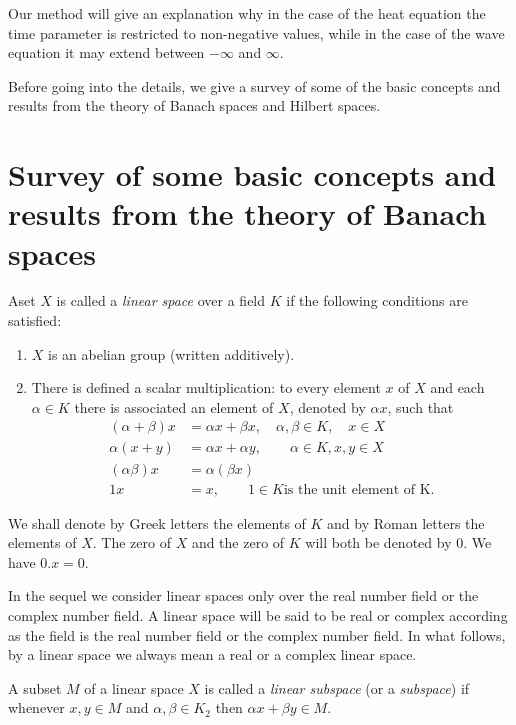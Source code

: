 Our method will give an explanation why in the case of the heat
equation the time parameter is restricted to non-negative values,
while in the case of the wave equation it may extend between $-
\infty$ and $\infty$. 

Before going into the details, we give a survey of some of the basic
concepts and results from the theory of Banach spaces and Hilbert
spaces. 

\part[Survey of some basic concepts and ...]{Survey of some basic concepts and results from the
 theory of Banach spaces}\label{chap1:p1} 

\begin{defi*}%
 A\pageoriginale set $X$ is called a {\em linear space} over a field $K$ if the
 following conditions are satisfied: 
 \begin{enumerate}[1)]
 \item $X$ is an abelian group (written additively).
 \item There is defined a scalar multiplication: to every element $x$
  of $X$ and each $\alpha \in K$ there is associated an element of
  $X$, denoted by $\alpha x$, such that 
 \begin{align*}
  (\alpha + \beta)x & = \alpha x + \beta x, \quad \alpha, \beta \in
  K, \quad x \in X\\ 
  \alpha (x + y) & = \alpha x + \alpha y, \qquad \alpha \in K, x, y
  \in X\\ 
  (\alpha \beta)x & = \alpha (\beta x)\\
  1x & = x, \qquad 1 \in K \text{is the unit element of K.}
 \end{align*}
 \end{enumerate}
\end{defi*}

We shall denote by Greek letters the elements of $K$ and by Roman
letters the elements of $X$. The zero of $X$ and the zero of $K$ will
both be denoted by $0$. We have $0.x = 0$. 

In the sequel we consider linear spaces only over the real number
field or the complex number field. A linear space will be said to be
real or complex according as the field is the real number field or the
complex number field. In what follows, by a linear space we always mean
a real or a complex linear space. 

\begin{defi*}%
 A subset $M$ of a linear space $X$ is called a {\em linear subspace}
 (or a {\em subspace}) if whenever $x, y \in M$ and $\alpha, \beta
 \in K_2$ then $\alpha x+ \beta y \in M$. 
\end{defi*}

